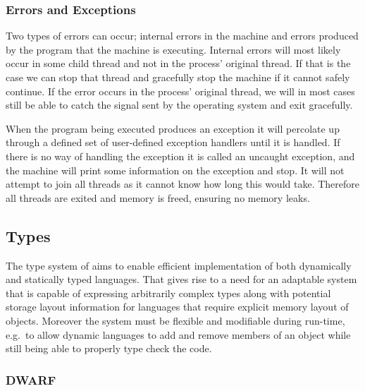\subsubsection{Errors and Exceptions}

Two types of errors can occur; internal errors in the machine and errors
produced by the program that the machine is executing. Internal errors will most
likely occur in some child thread and not in the process' original thread. If
that is the case we can stop that thread and gracefully stop the machine if it
cannot safely continue. If the error occurs in the process' original thread, we
will in most cases still be able to catch the signal sent by the operating
system and exit gracefully.

When the program being executed produces an exception it will percolate up
through a defined set of user-defined exception handlers until it is handled. If
there is no way of handling the exception it is called an uncaught exception,
and the machine will print some information on the exception and stop. It will
not attempt to join all threads as it cannot know how long this would
take. Therefore all threads are exited and memory is freed, ensuring no memory
leaks.

\subsection{Types}
\label{sec:design:types}

The type system of \thename{} aims to enable efficient implementation of both
dynamically and statically typed languages. That gives rise to a need for an
adaptable system that is capable of expressing arbitrarily complex types along
with potential storage layout information for languages that require explicit
memory layout of objects. Moreover the system must be flexible and modifiable
during run-time, e.g.~to allow dynamic languages to add and remove members of an
object while still being able to properly type check the code.

\subsubsection{DWARF}
\label{sec:design:types:dwarf}

